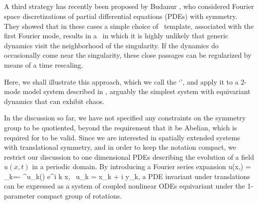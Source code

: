\documentclass[aip,cha,
reprint,
secnumarabic,
nofootinbib, tightenlines,
nobibnotes, showkeys, showpacs,
superscriptaddress,
]{revtex4-1}
\begin{document}
\subsection{\FFslice}
\label{sect:fFslice}

A third strategy has recently been proposed by Budanur
\etal{}, who considered Fourier space discretizations of
partial differential equations (PDEs) with  symmetry. They showed
that in these cases a simple choice of \slice\ template, associated with
the first Fourier mode, results in a \slice\ in which it is highly
unlikely that generic dynamics visit the neighborhood of the singularity.
If the dynamics do occasionally come near the singularity, these close
passages can be regularized by means of a time rescaling.

Here, we shall illustrate this approach, which we call the `\fFslice',
and apply it to a 2-mode model system described in ,
arguably the simplest system with  equivariant dynamics that can
exhibit chaos.

In the discussion so far, we have not specified any constraints on the 
symmetry group to be quotiented, beyond the requirement that it be Abelian, 
which is required for  to be valid. Since we are 
interested in spatially extended systems with translational symmetry, and in 
order to keep the notation compact, we restrict our discussion to one 
dimensional PDEs describing the evolution of a field $u(x,t)$ in a periodic 
domain. By introducing a Fourier series expansion
\beq
	u(x,\zeit) = \sum\limits_{k=- \infty}^\infty u_k\left(\zeit\right) 
				 e^{i k x}, \,\,\,u_k = x_k + i y_k,
a PDE invariant under translations can be expressed as a system of coupled 
nonlinear ODEs equivariant under the 1-parameter compact group of  
rotations.
\end{document}
